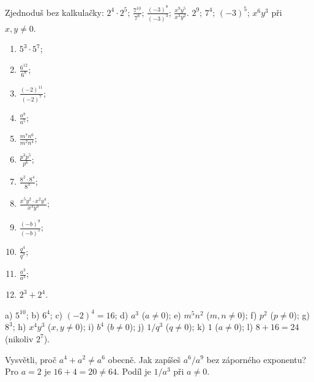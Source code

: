 \documentclass[11pt,a4paper]{article}
\begin{document}
\begin{prikladReseniBox}[title={Příklad 1 — zahřívací úpravy},breakable=false]
Zjednoduš bez kalkulačky:
$2^4\cdot2^5$; $\frac{7^{10}}{7^6}$; $\frac{(-3)^8}{(-3)^3}$;
$\frac{x^9y^5}{x^3y^2}$.
\tcblower
$2^9$; $7^4$; $(-3)^5$; $x^6y^3$ při $x,y\ne0$.
\end{prikladReseniBox}
\begin{zadaniReseniBox}[title={Samostatná práce 1 — dvanáct rychlých úloh}]
\begin{enumerate}[label=\alph*)]
\item $5^3\cdot5^7$; \item $\frac{6^{12}}{6^8}$;
\item $\frac{(-2)^{11}}{(-2)^7}$; \item $\frac{a^8}{a^5}$;
\item $\frac{m^7n^6}{m^2n^4}$; \item $\frac{p^3p^5}{p^6}$;
\item $\frac{8^2\cdot8^4}{8^3}$; \item $\frac{x^5y^2\cdot x^2y^4}{x^3y^3}$;
\item $\frac{(-b)^9}{(-b)^5}$; \item $\frac{q^4}{q^7}$;
\item $\frac{a^3}{a^3}$; \item $2^3+2^4$.
\end{enumerate}
\tcblower
 a) $5^{10}$; b) $6^4$; c) $(-2)^4=16$; d) $a^3$ ($a\ne0$);
 e) $m^5n^2$ ($m,n\ne0$); f) $p^2$ ($p\ne0$);
 g) $8^3$; h) $x^4y^3$ ($x,y\ne0$); i) $b^4$ ($b\ne0$);
 j) $1/q^3$ ($q\ne0$); k) $1$ ($a\ne0$);
 l) $8+16=24$ (nikoliv $2^7$).
\end{zadaniReseniBox}
\begin{zadaniReseniBox}[title={Rozšiřující příklad 1 — najdi chybu},breakable=false]
Vysvětli, proč $a^4+a^2\ne a^6$ obecně.
Jak zapíšeš $a^6/a^9$ bez záporného exponentu?
\tcblower
Pro $a=2$ je $16+4=20\ne64$. Podíl je $1/a^3$ při $a\ne0$.
\end{zadaniReseniBox}
\end{document}
